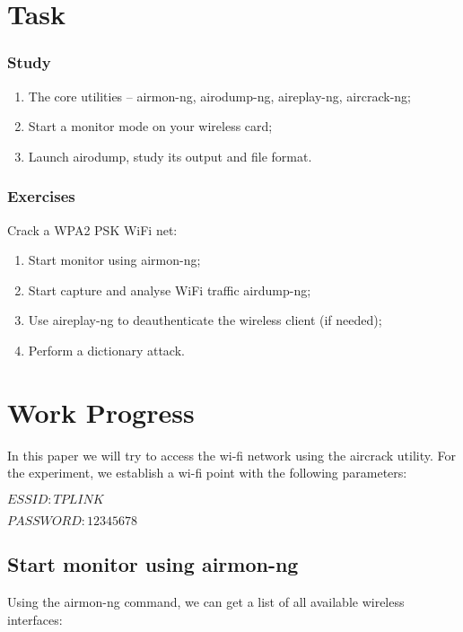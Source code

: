\documentclass[14pt,a4paper,report]{report}
\begin{document}
\section{Task}

\subsubsection{Study}

\begin{enumerate}
	\item The core utilities – airmon-ng, airodump-ng, aireplay-ng, aircrack-ng;
	\item Start a monitor mode on your wireless card;
	\item Launch airodump, study its output and file format.
\end{enumerate}

\subsubsection{Exercises}

Crack a WPA2 PSK WiFi net:

\begin{enumerate}
	\item Start monitor using airmon-ng;
	\item Start capture and analyse WiFi traffic airdump-ng;
	\item Use aireplay-ng to deauthenticate the wireless client (if needed);
	\item Perform a dictionary attack.
\end{enumerate}

\clearpage

\section{Work Progress}

In this paper we will try to access the wi-fi network using the aircrack utility. For the experiment, we establish a wi-fi point with the following parameters:

$ESSID: TPLINK$

$PASSWORD: 12345678$

\subsection{Start monitor using airmon-ng}

Using the airmon-ng command, we can get a list of all available wireless interfaces:
\end{document}
